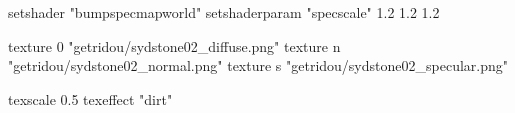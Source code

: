 setshader "bumpspecmapworld"
setshaderparam "specscale" 1.2 1.2 1.2

   texture 0 "getridou/sydstone02_diffuse.png"
   texture n "getridou/sydstone02_normal.png"
   texture s "getridou/sydstone02_specular.png"

texscale 0.5
texeffect "dirt"
